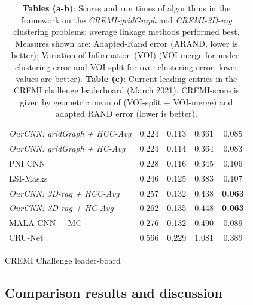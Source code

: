 \begin{table}[t]
\begin{subtable}[t]{.38\textwidth}
\begin{tabular}[t]{lcccc}
\emph{OurCNN: gridGraph + HCC-Avg} & 0.224 & 0.113 & 0.361 & 0.085  \\
\emph{OurCNN: gridGraph + HC-Avg}  & 0.224 & 0.114 &  0.364 & 0.083 \\
PNI CNN \cite{lee2017superhuman} & 0.228 & 0.116 & 0.345 & 0.106 \\
LSI-Masks \cite{bailoni2020proposal}  & 0.246 & 0.125 & 0.383 & 0.107  \\
\emph{OurCNN: 3D-rag + HCC-Avg} & 0.257 & 0.132 & 0.438& \textbf{0.063} \\  
\emph{OurCNN: 3D-rag + HC-Avg} & 0.262 & 0.135 & 0.448 & \textbf{0.063}   \\  
MALA CNN + MC \cite{funke2018large} & 0.276  & 0.132 &0.490  & 0.089  \\
CRU-Net \cite{zeng2017deepem3d} & 0.566 & 0.229 & 1.081 &  0.389    \\
        \end{tabular}
        \caption{CREMI Challenge leader-board}
        \label{tab:cremi_leaderboard}
        \end{subtable}
    \caption{\textbf{Tables (a-b)}: Scores and run times of algorithms in the \algname{} framework on the \emph{CREMI-gridGraph} and \emph{CREMI-3D-rag} clustering problems: average linkage methods performed best. Measures shown are: Adapted-Rand error (ARAND, lower is better); Variation of Information (VOI) \cite{arganda2015crowdsourcing} (VOI-merge for under-clustering error and VOI-split for over-clustering error, lower values are better). \textbf{Table (c)}: Current leading entries in the CREMI challenge leaderboard (March 2021). CREMI-score is given by geometric mean of (VOI-split + VOI-merge)  and adapted RAND error (lower is better).}
    \label{tab:scores}
\end{table}

\subsection{Comparison results and discussion}

